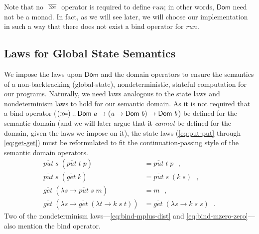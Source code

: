 \documentclass{llncs}
\newcommand{\Conid}[1]{\mathit{#1}}
\newcommand{\Varid}[1]{\mathit{#1}}
\let\Varid\mathit
\let\Conid\mathsf
\begin{document}
Note that no \ensuremath{~\overline{\hstretch{0.7}{>\!\!>\!\!=}}~} operator is required to define \ensuremath{\Varid{run}};
in other words, \ensuremath{\Conid{Dom}} need not be a monad.
In fact, as we will see later, we will choose our implementation in such a way
that there does not exist a bind operator for \ensuremath{\Varid{run}}.

\subsection{Laws for Global State Semantics}
\label{sec:model-global-state-sem}
We impose the laws upon \ensuremath{\Conid{Dom}} and the domain operators to ensure the semantics of a
non-backtracking (global-state),
nondeterministic, stateful computation for our programs.
Naturally, we need laws analogous to the state laws and nondeterminism laws to
hold for our semantic domain.
As it is not required that a bind operator
(\ensuremath{(\mathrel{\hstretch{0.7}{>\!\!>\!\!=}})\mathbin{::}\Conid{Dom}\;\Varid{a}\to (\Varid{a}\to \Conid{Dom}\;\Varid{b})\to \Conid{Dom}\;\Varid{b}}) be defined for the semantic
domain (and we will later argue that it \emph{cannot} be defined for the domain,
given the laws we impose on it), the state laws
(\eqref{eq:put-put} through \eqref{eq:get-get})
must be reformulated to fit the continuation-passing style of the semantic domain
operators.
\begin{align}
  \ensuremath{\overline{\Varid{put}}\;\Varid{s}\;(\overline{\Varid{put}}\;\Varid{t}\;\Varid{p})} &= \ensuremath{\overline{\Varid{put}}\;\Varid{t}\;\Varid{p}} \mbox{~~,} \label{eq:put-put-g-d} \\
  \ensuremath{\overline{\Varid{put}}\;\Varid{s}\;(\overline{\Varid{get}}\;\Varid{k})} &= \ensuremath{\overline{\Varid{put}}\;\Varid{s}\;(\Varid{k}\;\Varid{s})} \mbox{~~,} \label{eq:put-get-g-d} \\
  \ensuremath{\overline{\Varid{get}}\;(\lambda \Varid{s}\to \overline{\Varid{put}}\;\Varid{s}\;\Varid{m})} &= \ensuremath{\Varid{m}} \mbox{~~,} \label{eq:get-put-g-d} \\
  \ensuremath{\overline{\Varid{get}}\;(\lambda \Varid{s}\to \overline{\Varid{get}}\;(\lambda \Varid{t}\to \Varid{k}\;\Varid{s}\;\Varid{t}))} &= \ensuremath{\overline{\Varid{get}}\;(\lambda \Varid{s}\to \Varid{k}\;\Varid{s}\;\Varid{s})} \mbox{~~.} \label{eq:get-get-g-d}
\end{align}
Two of the nondeterminism
laws---\eqref{eq:bind-mplus-dist} and
\eqref{eq:bind-mzero-zero}---also mention the bind operator.
\end{document}
